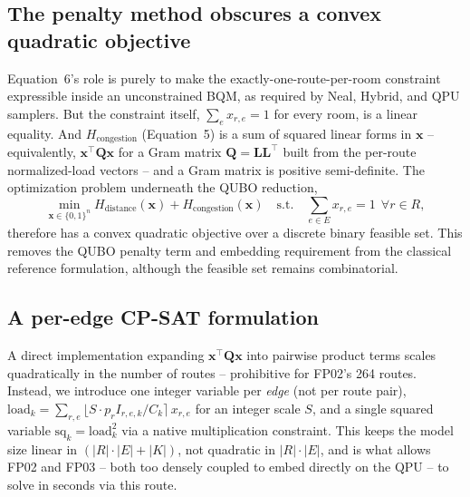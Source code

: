 \documentclass[11pt]{article}
\begin{document}
\subsection{The penalty method obscures a convex quadratic objective}
Equation~6's role is purely to make the exactly-one-route-per-room constraint expressible inside an unconstrained BQM, as required by Neal, Hybrid, and QPU samplers. But the constraint itself, $\sum_{e} x_{r,e} = 1$ for every room, is a linear equality. And $H_{\text{congestion}}$ (Equation~5) is a sum of squared linear forms in $\mathbf{x}$ -- equivalently, $\mathbf{x}^\top \mathbf{Q} \mathbf{x}$ for a Gram matrix $\mathbf{Q} = \mathbf{L}\mathbf{L}^\top$ built from the per-route normalized-load vectors -- and a Gram matrix is positive semi-definite. The optimization problem underneath the QUBO reduction,
\begin{equation}
\min_{\mathbf{x} \in \{0,1\}^n} H_{\text{distance}}(\mathbf{x}) + H_{\text{congestion}}(\mathbf{x}) \quad \text{s.t.} \quad \sum_{e \in E} x_{r,e} = 1 \ \ \forall r \in R, \tag{8}
\end{equation}
therefore has a convex quadratic objective over a discrete binary feasible set. This removes the QUBO penalty term and embedding requirement from the classical reference formulation, although the feasible set remains combinatorial.

\subsection{A per-edge CP-SAT formulation}
A direct implementation expanding $\mathbf{x}^\top\mathbf{Q}\mathbf{x}$ into pairwise product terms scales quadratically in the number of routes -- prohibitive for FP02's 264 routes. Instead, we introduce one integer variable per \emph{edge} (not per route pair), $\text{load}_k = \sum_{r,e} \lfloor S \cdot p_r I_{r,e,k} / C_k \rceil\, x_{r,e}$ for an integer scale $S$, and a single squared variable $\text{sq}_k = \text{load}_k^2$ via a native multiplication constraint. This keeps the model size linear in $(|R|\!\cdot\!|E| + |K|)$, not quadratic in $|R|\!\cdot\!|E|$, and is what allows FP02 and FP03 -- both too densely coupled to embed directly on the QPU -- to solve in seconds via this route.
\end{document}
